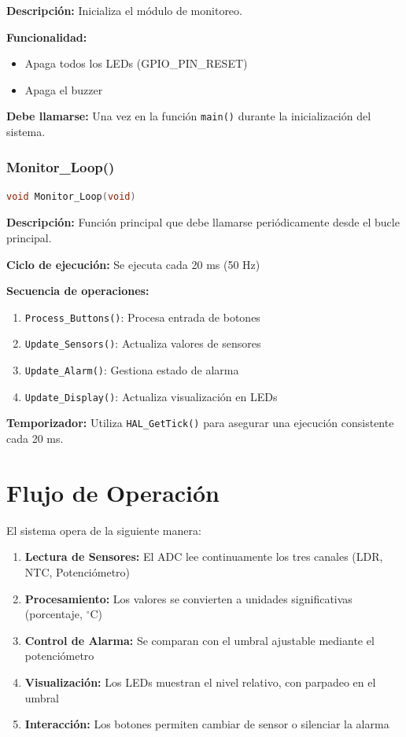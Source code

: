 \documentclass[12pt,a4paper]{article}
\begin{document}
\textbf{Descripción:} Inicializa el módulo de monitoreo.

\textbf{Funcionalidad:}
\begin{itemize}
    \item Apaga todos los LEDs (GPIO\_PIN\_RESET)
    \item Apaga el buzzer
\end{itemize}

\textbf{Debe llamarse:} Una vez en la función \texttt{main()} durante la inicialización del sistema.

\subsubsection{Monitor\_Loop()}
\begin{lstlisting}[language=C, caption=Bucle principal de monitoreo]
void Monitor_Loop(void)
\end{lstlisting}

\textbf{Descripción:} Función principal que debe llamarse periódicamente desde el bucle principal.

\textbf{Ciclo de ejecución:} Se ejecuta cada 20 ms (50 Hz)

\textbf{Secuencia de operaciones:}
\begin{enumerate}
    \item \texttt{Process\_Buttons()}: Procesa entrada de botones
    \item \texttt{Update\_Sensors()}: Actualiza valores de sensores
    \item \texttt{Update\_Alarm()}: Gestiona estado de alarma
    \item \texttt{Update\_Display()}: Actualiza visualización en LEDs
\end{enumerate}

\textbf{Temporizador:} Utiliza \texttt{HAL\_GetTick()} para asegurar una ejecución consistente cada 20 ms.

\section{Flujo de Operación}

El sistema opera de la siguiente manera:

\begin{enumerate}
    \item \textbf{Lectura de Sensores:} El ADC lee continuamente los tres canales (LDR, NTC, Potenciómetro)
    \item \textbf{Procesamiento:} Los valores se convierten a unidades significativas (porcentaje, $^\circ$C)
    \item \textbf{Control de Alarma:} Se comparan con el umbral ajustable mediante el potenciómetro
    \item \textbf{Visualización:} Los LEDs muestran el nivel relativo, con parpadeo en el umbral
    \item \textbf{Interacción:} Los botones permiten cambiar de sensor o silenciar la alarma
\end{enumerate}
\end{document}
